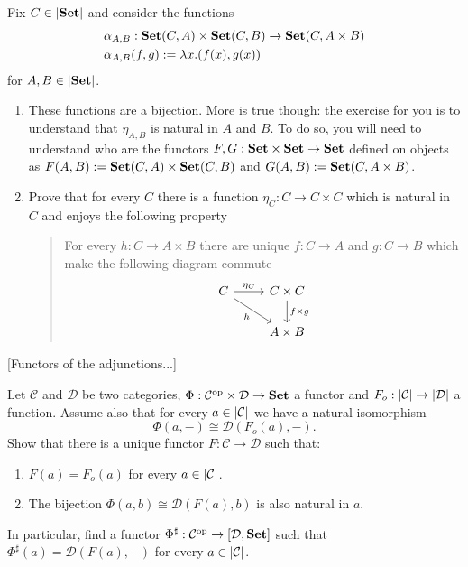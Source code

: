 \begin{exercise}
  Fix \(C \in \left\lvert\mathbf{Set}\right\rvert\) and consider the functions
  \begin{align*}
    & \alpha_{A,B} : \mathbf{Set}(C, A) \times \mathbf{Set}(C, B) \to \mathbf{Set}(C, A \times B) \\
    & \alpha_{A,B}(f, g) :=  \lambda x . (f(x), g(x))
  \end{align*}
  for \(A, B \in \left\lvert\mathbf{Set}\right\rvert\).
  \begin{enumerate}
  \item These functions are a bijection. More is true though: the
    exercise for you is to understand that \(\eta_{A, B}\) is natural in
    \(A\) and \(B\). To do so, you will need to understand who are the
    functors \(F, G : \mathbf{Set} \times \mathbf{Set} \to \mathbf{Set}\) defined on objects as
    \(F(A, B) := \mathbf{Set}(C, A) \times \mathbf{Set}(C, B)\) and
    \(G(A, B) := \mathbf{Set}(C, A \times B)\).
  \item Prove that for every \(C\) there is a function
    \(\eta_C : C \to C \times C\) which is natural in \(C\) and enjoys the
    following property
    \begin{quote}
      For every \(h : C \to A \times B\) there are unique
      \(f : C \to A\) and \(g : C \to B\) which make the following diagram
      commute
      \[
        \begin{tikzcd}
          C \ar["{\eta_C}", r] \ar["{h}", dr, swap] & C \times C \ar["{f \times g}",
          d] \\
          & A \times B
        \end{tikzcd}
      \]
    \end{quote}
  \end{enumerate}
\end{exercise}

\begin{exercise}
  {\color{red} [Functors of the adjunctions...]}
\end{exercise}

\begin{exercise}
  Let \(\mathcal{C}\) and \(\mathcal{D}\) be two categories, \(\Phi : \mathcal{C}^\text{op} \times \mathcal{D} \to \mathbf{Set}\) a
  functor and \(F_o : \left\lvert\mathcal{C}\right\rvert \to \left\lvert\mathcal{D}\right\rvert\) a function. Assume also that
  for every \(a \in \left\lvert\mathcal{C}\right\rvert\) we have a natural isomorphism
  \[
    \Phi(a, -) \cong \mathcal{D}(F_o(a), -) .
  \]
  Show that there is a unique functor \(F : \mathcal{C} \to \mathcal{D}\) such that:
  \begin{enumerate}
  \item \(F(a) = F_o(a)\) for every \(a \in \left\lvert\mathcal{C}\right\rvert\).
  \item The bijection \(\Phi(a, b) \cong \mathcal{D}(F(a), b)\) is also natural in \(a\).
  \end{enumerate}
  In particular, find a functor \(\Phi^\sharp : \mathcal{C}^\text{op} \to [\mathcal{D}, \mathbf{Set}]\) such that
  \(\Phi^\sharp (a) = \mathcal{D}(F(a), -)\) for every \(a \in \left\lvert\mathcal{C}\right\rvert\).
\end{exercise}

